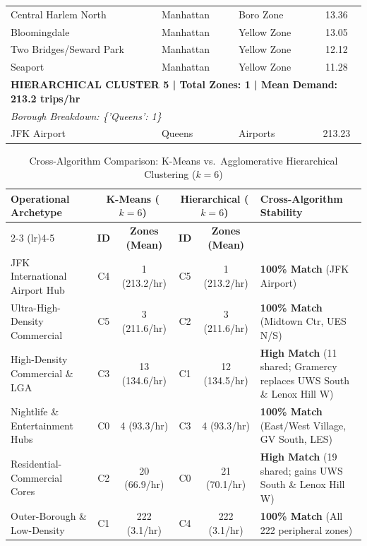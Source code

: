 \documentclass[11pt,a4paper]{article}
\begin{document}
\begin{table}[htbp]
\begin{tabular}{lllc}
        Central Harlem North & Manhattan & Boro Zone & 13.36 \\
        Bloomingdale & Manhattan & Yellow Zone & 13.05 \\
        Two Bridges/Seward Park & Manhattan & Yellow Zone & 12.12 \\
        Seaport & Manhattan & Yellow Zone & 11.28 \\
        \midrule
        \multicolumn{4}{l}{\textbf{HIERARCHICAL CLUSTER 5 | Total Zones: 1 | Mean Demand: 213.2 trips/hr}} \\
        \multicolumn{4}{l}{\textit{Borough Breakdown: \{'Queens': 1\}}} \\
        \midrule
        JFK Airport & Queens & Airports & 213.23 \\
        \bottomrule
    \end{tabular}
\end{table}

\begin{table}[htbp]
    \centering
    \small
    \caption{Cross-Algorithm Comparison: K-Means vs.\ Agglomerative Hierarchical Clustering ($k = 6$)}
    \label{tab:kmeans_vs_hierarchical}
    \begin{tabular}{@{}p{3.4cm}cc cc p{4.2cm}@{}}
        \toprule
        \textbf{Operational Archetype} & \multicolumn{2}{c}{\textbf{K-Means ($k=6$)}} & \multicolumn{2}{c}{\textbf{Hierarchical ($k=6$)}} & \textbf{Cross-Algorithm Stability} \\
        \cmidrule(lr){2-3} \cmidrule(lr){4-5}
         & \textbf{ID} & \textbf{Zones (Mean)} & \textbf{ID} & \textbf{Zones (Mean)} & \\
        \midrule
        JFK International Airport Hub & C4 & 1 (213.2/hr) & C5 & 1 (213.2/hr) & \textbf{100\% Match} (JFK Airport) \\
        \addlinespace
        Ultra-High-Density Commercial & C5 & 3 (211.6/hr) & C2 & 3 (211.6/hr) & \textbf{100\% Match} (Midtown Ctr, UES N/S) \\
        \addlinespace
        High-Density Commercial \& LGA & C3 & 13 (134.6/hr) & C1 & 12 (134.5/hr) & \textbf{High Match} (11 shared; Gramercy replaces UWS South \& Lenox Hill W) \\
        \addlinespace
        Nightlife \& Entertainment Hubs & C0 & 4 (93.3/hr) & C3 & 4 (93.3/hr) & \textbf{100\% Match} (East/West Village, GV South, LES) \\
        \addlinespace
        Residential-Commercial Cores & C2 & 20 (66.9/hr) & C0 & 21 (70.1/hr) & \textbf{High Match} (19 shared; gains UWS South \& Lenox Hill W) \\
        \addlinespace
        Outer-Borough \& Low-Density & C1 & 222 (3.1/hr) & C4 & 222 (3.1/hr) & \textbf{100\% Match} (All 222 peripheral zones) \\
        \bottomrule
    \end{tabular}
\end{table}
\end{document}
